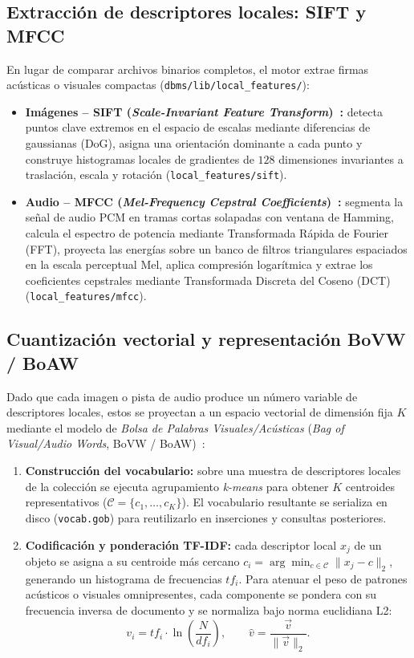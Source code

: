\documentclass[11pt,a4paper]{article}
\begin{document}
\subsection{Extracción de descriptores locales: SIFT y MFCC}

En lugar de comparar archivos binarios completos, el motor extrae firmas acústicas o visuales compactas (\texttt{dbms/lib/local\_features/}):

\begin{itemize}
  \item \textbf{Imágenes -- SIFT (\emph{Scale-Invariant Feature Transform})~\cite{lowe2004}:} detecta puntos clave extremos en el espacio de escalas mediante diferencias de gaussianas (DoG), asigna una orientación dominante a cada punto y construye histogramas locales de gradientes de $128$ dimensiones invariantes a traslación, escala y rotación (\texttt{local\_features/sift}).
  \item \textbf{Audio -- MFCC (\emph{Mel-Frequency Cepstral Coefficients})~\cite{davis1980}:} segmenta la señal de audio PCM en tramas cortas solapadas con ventana de Hamming, calcula el espectro de potencia mediante Transformada Rápida de Fourier (FFT), proyecta las energías sobre un banco de filtros triangulares espaciados en la escala perceptual Mel, aplica compresión logarítmica y extrae los coeficientes cepstrales mediante Transformada Discreta del Coseno (DCT) (\texttt{local\_features/mfcc}).
\end{itemize}

\subsection{Cuantización vectorial y representación BoVW / BoAW}

Dado que cada imagen o pista de audio produce un número variable de descriptores locales, estos se proyectan a un espacio vectorial de dimensión fija $K$ mediante el modelo de \emph{Bolsa de Palabras Visuales/Acústicas} (\emph{Bag of Visual/Audio Words}, BoVW / BoAW)~\cite{jegou2011}:

\begin{enumerate}
  \item \textbf{Construcción del vocabulario:} sobre una muestra de descriptores locales de la colección se ejecuta agrupamiento \emph{k-means} para obtener $K$ centroides representativos ($\mathcal{C} = \{c_1, \dots, c_K\}$). El vocabulario resultante se serializa en disco (\texttt{vocab.gob}) para reutilizarlo en inserciones y consultas posteriores.
  \item \textbf{Codificación y ponderación TF-IDF:} cada descriptor local $x_j$ de un objeto se asigna a su centroide más cercano $c_i = \arg\min_{c \in \mathcal{C}} \|x_j - c\|_2$, generando un histograma de frecuencias $tf_i$. Para atenuar el peso de patrones acústicos o visuales omnipresentes, cada componente se pondera con su frecuencia inversa de documento y se normaliza bajo norma euclidiana L2:
  \[
    v_i = tf_i \cdot \ln\!\left(\frac{N}{df_i}\right), \qquad \hat{v} = \frac{\vec{v}}{\|\vec{v}\|_2}.
  \]
\end{enumerate}
\end{document}
